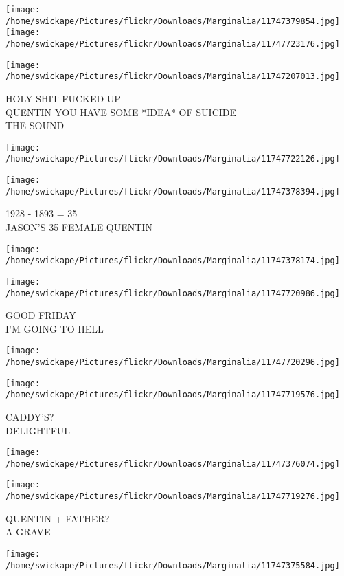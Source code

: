 \documentclass[10pt,letterpaper]{article}
\begin{document}
\texttt{[image: /home/swickape/Pictures/flickr/Downloads/Marginalia/11747379854.jpg]}
\texttt{[image: /home/swickape/Pictures/flickr/Downloads/Marginalia/11747723176.jpg]}

\vspace{0.25in}
\texttt{[image: /home/swickape/Pictures/flickr/Downloads/Marginalia/11747207013.jpg]}

HOLY SHIT FUCKED UP\\
QUENTIN YOU HAVE SOME *IDEA* OF SUICIDE\\
THE SOUND
\pagebreak

\texttt{[image: /home/swickape/Pictures/flickr/Downloads/Marginalia/11747722126.jpg]}

\vspace{0.25in}
\texttt{[image: /home/swickape/Pictures/flickr/Downloads/Marginalia/11747378394.jpg]}

1928 {-} 1893 = 35\\
JASON'S 35 FEMALE QUENTIN
\pagebreak

\texttt{[image: /home/swickape/Pictures/flickr/Downloads/Marginalia/11747378174.jpg]}

\vspace{0.25in}
\texttt{[image: /home/swickape/Pictures/flickr/Downloads/Marginalia/11747720986.jpg]}

GOOD FRIDAY\\
I'M GOING TO HELL
\pagebreak

\texttt{[image: /home/swickape/Pictures/flickr/Downloads/Marginalia/11747720296.jpg]}

\vspace{0.25in}
\texttt{[image: /home/swickape/Pictures/flickr/Downloads/Marginalia/11747719576.jpg]}

CADDY'S?\\
DELIGHTFUL
\pagebreak

\texttt{[image: /home/swickape/Pictures/flickr/Downloads/Marginalia/11747376074.jpg]}

\vspace{0.25in}
\texttt{[image: /home/swickape/Pictures/flickr/Downloads/Marginalia/11747719276.jpg]}

QUENTIN + FATHER?\\
A GRAVE
\pagebreak

\texttt{[image: /home/swickape/Pictures/flickr/Downloads/Marginalia/11747375584.jpg]}
\end{document}

